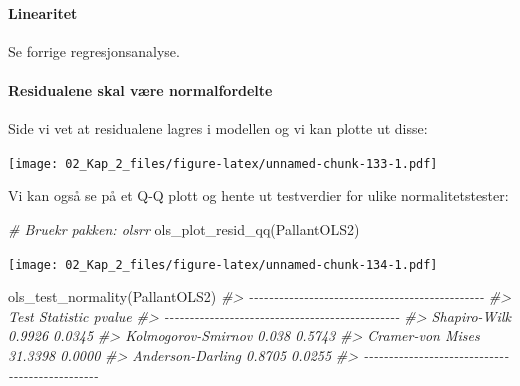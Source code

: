 \documentclass[
]{article}
\newenvironment{Shaded}{\begin{snugshade}}{\end{snugshade}}
\newcommand{\CommentTok}[1]{\textcolor[rgb]{0.56,0.35,0.01}{\textit{#1}}}
\newcommand{\FunctionTok}[1]{\textcolor[rgb]{0.00,0.00,0.00}{#1}}
\newcommand{\NormalTok}[1]{#1}
\newcommand{\SpecialCharTok}[1]{\textcolor[rgb]{0.00,0.00,0.00}{#1}}
\begin{document}
\hypertarget{linearitet-2}{%
\paragraph{Linearitet}\label{linearitet-2}}

Se forrige regresjonsanalyse.

\hypertarget{residualene-skal-vuxe6re-normalfordelte-2}{%
\paragraph{Residualene skal være normalfordelte}\label{residualene-skal-vuxe6re-normalfordelte-2}}

Side vi vet at residualene lagres i modellen og vi kan plotte ut disse:

\begin{Shaded}
\end{Shaded}

\texttt{[image: 02\_Kap\_2\_files/figure-latex/unnamed-chunk-133-1.pdf]}

Vi kan også se på et Q-Q plott og hente ut testverdier for ulike normalitetstester:

\begin{Shaded}
\begin{Highlighting}[]
\CommentTok{\# Bruekr pakken: olsrr}
\FunctionTok{ols\_plot\_resid\_qq}\NormalTok{(PallantOLS2)}
\end{Highlighting}
\end{Shaded}

\texttt{[image: 02\_Kap\_2\_files/figure-latex/unnamed-chunk-134-1.pdf]}

\begin{Shaded}
\begin{Highlighting}[]
\FunctionTok{ols\_test\_normality}\NormalTok{(PallantOLS2)}
\CommentTok{\#\textgreater{} {-}{-}{-}{-}{-}{-}{-}{-}{-}{-}{-}{-}{-}{-}{-}{-}{-}{-}{-}{-}{-}{-}{-}{-}{-}{-}{-}{-}{-}{-}{-}{-}{-}{-}{-}{-}{-}{-}{-}{-}{-}{-}{-}{-}{-}{-}{-}}
\CommentTok{\#\textgreater{}        Test             Statistic       pvalue  }
\CommentTok{\#\textgreater{} {-}{-}{-}{-}{-}{-}{-}{-}{-}{-}{-}{-}{-}{-}{-}{-}{-}{-}{-}{-}{-}{-}{-}{-}{-}{-}{-}{-}{-}{-}{-}{-}{-}{-}{-}{-}{-}{-}{-}{-}{-}{-}{-}{-}{-}{-}{-}}
\CommentTok{\#\textgreater{} Shapiro{-}Wilk              0.9926         0.0345 }
\CommentTok{\#\textgreater{} Kolmogorov{-}Smirnov        0.038          0.5743 }
\CommentTok{\#\textgreater{} Cramer{-}von Mises         31.3398         0.0000 }
\CommentTok{\#\textgreater{} Anderson{-}Darling          0.8705         0.0255 }
\CommentTok{\#\textgreater{} {-}{-}{-}{-}{-}{-}{-}{-}{-}{-}{-}{-}{-}{-}{-}{-}{-}{-}{-}{-}{-}{-}{-}{-}{-}{-}{-}{-}{-}{-}{-}{-}{-}{-}{-}{-}{-}{-}{-}{-}{-}{-}{-}{-}{-}{-}{-}}
\end{Highlighting}
\end{Shaded}
\end{document}
